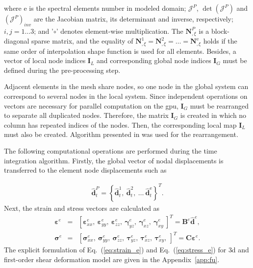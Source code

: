 %
where e is the spectral elements number in modeled domain; \(\mathcal{J}^P\), \(\det\left(\mathcal{J}^P\right)\) and \(\left(\mathcal{J}^P\right)_{inv}\) are the Jacobian matrix, its determinant and inverse, respectively; $i,j=1\ldots3$; and '$\circ$' denotes element-wise multiplication.
The $\textbf{N}^P_{,\xi}$ is a block-diagonal sparse matrix, and the equality of $\textbf{N}^1_{,\xi}=\textbf{N}^2_{,\xi}=\ldots=\textbf{N}^{\mathrm{e}}_{,\xi}$ holds if the same order of interpolation shape function is used for all elements.
Besides, a vector of local node indices \(\textbf{I}_L\) and corresponding global node indices \(\textbf{I}_G\) must be defined during the pre-processing step.

Adjacent elements in the mesh share nodes, so one node in the global system can correspond to several nodes in the local system.
Since independent operations on vectors are necessary for parallel computation on the \ac{gpu}, $\textbf{I}_G$ must be rearranged to separate all duplicated nodes.
Therefore, the matrix $\textbf{I}_G$ is created in which no column has repeated indices of the nodes.
Then, the corresponding local map $\textbf{I}_L$ must also be created.
Algorithm presented in \cite{kudela2016parallel} was used for the rearrangement.

The following computational operations are performed during the time integration algorithm. Firstly, the global vector of nodal displacements is transferred to the element node displacements such as

\begin{eqnarray}
	\widehat{\textbf{d}}_t^P = \left\{\widehat{\textbf{d}}_t^{1},\ \widehat{\textbf{d}}_t^{2},\ \ldots\ \widehat{\textbf{d}}_t^{\mathrm{e}}\right\}^T.
\end{eqnarray}
Next, the strain and stress vectors are calculated as
\begin{eqnarray}
	\label{eq:strain_e}
	\boldsymbol{\varepsilon}^e & = & \left[\boldsymbol{\varepsilon}^e_{xx},\ \boldsymbol{\varepsilon}^e_{yy},\ \boldsymbol{\varepsilon}^e_{zz},\ \boldsymbol{\gamma}^e_{yz},\ \boldsymbol{\gamma}^e_{xz},\ \boldsymbol{\gamma}^e_{xy}\ \right]^T=\textbf{B}^e\widehat{\textbf{d}}^e,\\
	\label{eq:stress_e}
	\boldsymbol{\sigma}^e & = & \left[\boldsymbol{\sigma}^e_{xx},\ \boldsymbol{\sigma}^e_{yy},\ \boldsymbol{\sigma}^e_{zz},\ \boldsymbol{\tau}^e_{yz},\ \boldsymbol{\tau}^e_{xz},\ \boldsymbol{\tau}^e_{xy},\ \right]^T=\textbf{C}\boldsymbol{\varepsilon}^e.
\end{eqnarray}
The explicit formulation of Eq.~(\ref{eq:strain_e}) and Eq.~(\ref{eq:stress_e}) for \ac{3d} and first-order shear deformation model are given in the Appendix~\ref{app:fu}.

